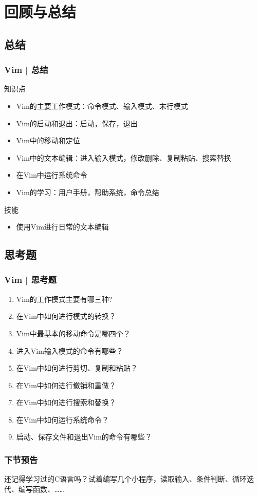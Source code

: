\section{回顾与总结}
\subsection{总结}
\begin{frame}
  \frametitle{Vim | 总结}
  \begin{block}{知识点}
    \begin{itemize}
      \item Vim的主要工作模式：命令模式、输入模式、末行模式
      \item Vim的启动和退出：启动，保存，退出
      \item Vim中的移动和定位
      \item Vim中的文本编辑：进入输入模式，修改删除、复制粘贴、搜索替换
      \item 在Vim中运行系统命令
      \item Vim的学习：用户手册，帮助系统，命令总结
    \end{itemize}
  \end{block}
  \begin{block}{技能}
    \begin{itemize}
      \item 使用Vim进行日常的文本编辑
    \end{itemize}
  \end{block}
\end{frame}

\subsection{思考题}
\begin{frame}
  \frametitle{Vim | 思考题}
  \begin{enumerate}
    \item Vim的工作模式主要有哪三种?
    \item 在Vim中如何进行模式的转换？
    \item Vim中最基本的移动命令是哪四个？
    \item 进入Vim输入模式的命令有哪些？
    \item 在Vim中如何进行剪切、复制和粘贴？
    \item 在Vim中如何进行撤销和重做？
    \item 在Vim中如何进行搜索和替换？
    \item 在Vim中如何运行系统命令？
    \item 启动、保存文件和退出Vim的命令有哪些？
  \end{enumerate}
\end{frame}

\begin{frame}
  \frametitle{下节预告}
  还记得学习过的C语言吗？试着编写几个小程序，读取输入、条件判断、循环迭代、编写函数、……
\end{frame}




